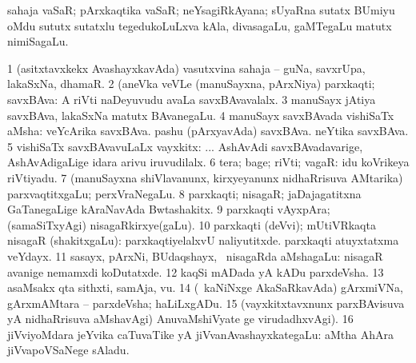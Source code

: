 \bentry
{}
\gl{\nA}
\bmng
sahaja vaSaR; pArxkaqtika vaSaR; neYsagiRkAyana; sUyaRna sutatx BUmiyu oMdu sututx sutatxlu tegedukoLuLxva kAla,  divasagaLu,  gaMTegaLu matutx  nimiSagaLu. 
\emng
\eentry

\bentry
{}
\gl{\nA}
\bmng
\bnum
\num{1} (asitxtavxkekx AvashayxkavAda) vasutxvina sahaja -- guNa, savxrUpa, lakaSxNa, dhamaR. 
\num{2} (aneVka veVLe (manuSayxna, pArxNiya) parxkaqti; savxBAva:  A riVti naDeyuvudu avaLa savxBAvavalalx. 
\num{3} manuSayx jAtiya savxBAva, lakaSxNa matutx BAvanegaLu. 
\num{4} manuSayx savxBAvada vishiSaTx aMsha:  veYcArika savxBAva.  pashu (pArxyavAda) savxBAva.  neYtika savxBAva. 
\num{5} vishiSaTx savxBAvavuLaLx vayxkitx: ... AshAvAdi savxBAvadavarige, AshAvAdigaLige idara arivu iruvudilalx. 
\num{6} tera; bage; riVti; vagaR:  idu koVrikeya riVtiyadu. 
\num{7} (manuSayxna shiVlavanunx, kirxyeyanunx nidhaRrisuva AMtarika) parxvaqtitxgaLu; perxVraNegaLu. 
\num{8} parxkaqti; nisagaR; jaDajagatitxna GaTanegaLige kAraNavAda Bwtashakitx. 
\num{9} parxkaqti vAyxpAra; (samaSiTxyAgi) nisagaRkirxye(gaLu). 
\num{10} parxkaqti (deVvi); mUtiVRkaqta nisagaR (shakitxgaLu):  parxkaqtiyelalxvU naliyutitxde.  parxkaqti atuyxtatxma veYdayx. 
\num{11} sasayx, pArxNi, BUdaqshayx, \mo\ nisagaRda aMshagaLu:  nisagaR avanige nemamxdi koDutatxde. 
\num{12} kaqSi mADada yA kADu parxdeVsha. 
\num{13} asaMsakx qta sithxti, samAja, \mo vu. 
\num{14} (\kanmu\ kaNiNxge AkaSaRkavAda) gArxmiVNa, gArxmAMtara -- parxdeVsha; haLiLxgADu. 
\num{15} (vayxkitxtavxnunx parxBAvisuva yA nidhaRrisuva aMshavAgi) AnuvaMshiVyate ge virudadhxvAgi). 
\num{16} jiVviyoMdara jeYvika caTuvaTike yA jiVvanAvashayxkategaLu:  aMtha AhAra jiVvapoVSaNege sAladu. 
\enum
\emng

